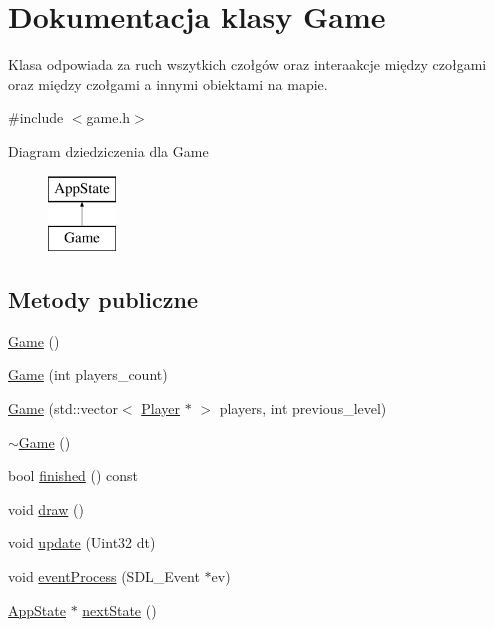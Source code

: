 \hypertarget{class_game}{}\section{Dokumentacja klasy Game}
\label{class_game}


Klasa odpowiada za ruch wszytkich czołgów oraz interaakcje między czołgami oraz między czołgami a innymi obiektami na mapie.  




{\ttfamily \#include $<$game.\+h$>$}

Diagram dziedziczenia dla Game\begin{figure}[H]
\begin{center}
\leavevmode
\includegraphics[height=2.000000cm]{class_game}
\end{center}
\end{figure}
\subsection*{Metody publiczne}
\begin{DoxyCompactItemize}
\item 
\hyperlink{class_game_ad59df6562a58a614fda24622d3715b65}{Game} ()
\item 
\hyperlink{class_game_ac39b8dddf91cc448f63ec5dce5783cfd}{Game} (int players\+\_\+count)
\item 
\hyperlink{class_game_a12188b30c73c94a33df229b924c00600}{Game} (std\+::vector$<$ \hyperlink{class_player}{Player} $\ast$ $>$ players, int previous\+\_\+level)
\item 
\hyperlink{class_game_ae3d112ca6e0e55150d2fdbc704474530}{$\sim$\+Game} ()
\item 
bool \hyperlink{class_game_ad425f484c9b48d968ab76632fda9b2f3}{finished} () const 
\item 
void \hyperlink{class_game_a6d54497ce3a66f6dd45eacfdccc8d0bd}{draw} ()
\item 
void \hyperlink{class_game_a502c1be9a7afadbfc679d501034c7b4a}{update} (Uint32 dt)
\item 
void \hyperlink{class_game_abd882b2a5629e55ac4df6d39a6f3311f}{event\+Process} (S\+D\+L\+\_\+\+Event $\ast$ev)
\item 
\hyperlink{class_app_state}{App\+State} $\ast$ \hyperlink{class_game_a7dcc996fd972a30a8038c575a72ccaa2}{next\+State} ()
\end{DoxyCompactItemize}


